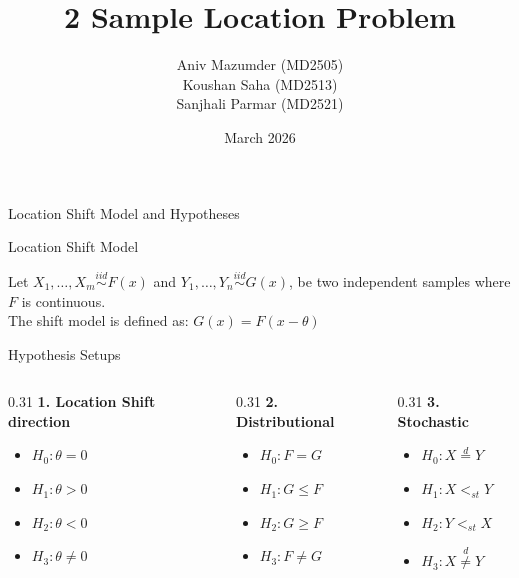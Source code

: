 \documentclass[8pt]{beamer}
\title[2-Sample Location Problem]{2 Sample Location Problem}
\author[]{Aniv Mazumder (MD2505) \\ Koushan Saha (MD2513) \\ Sanjhali Parmar (MD2521)}
\institute[]{Indian Statistical Institute \\ M.Stat, 2nd Semester}
\date{March 2026}
\begin{document}
\begin{frame}
    \titlepage
\end{frame}

\begin{frame}{Location Shift Model and Hypotheses}
    \footnotesize %

    \begin{block}{Location Shift Model}
    \begin{center}
        Let $X_1, \dots, X_m \stackrel{iid}{\sim} F(x)$ and $Y_1, \dots, Y_n \stackrel{iid}{\sim} G(x)$, be two independent samples where $F$ is continuous. \\
        The shift model is defined as: $G(x) = F(x - \theta)$
    \end{center}
    \end{block}

    \begin{block}{Hypothesis Setups}
        \begin{columns}[t]
            \begin{column}{0.31\textwidth}
                \textbf{1. Location Shift direction}
                \begin{itemize}
                    \item $H_0: \theta = 0$
                    \item $H_1: \theta > 0$
                    \item $H_2: \theta < 0$
                    \item $H_3: \theta \neq 0$
                \end{itemize}
            \end{column}
            \begin{column}{0.31\textwidth}
                \textbf{2. Distributional}
                \begin{itemize}
                    \item $H_0: F = G$
                    \item $H_1: G \leq F$
                    \item $H_2: G \geq F$
                    \item $H_3: F \neq G$
                \end{itemize}
            \end{column}
            \begin{column}{0.31\textwidth}
                \textbf{3. Stochastic}
                \begin{itemize}
                    \item $H_0: X \stackrel{d}{=} Y$
                    \item $H_1: X <_{st} Y$
                    \item $H_2: Y <_{st} X$
                    \item $H_3: X \stackrel{d}{\neq} Y$
                \end{itemize}
            \end{column}
        \end{columns}
    \end{block}


\end{frame}
\end{document}
